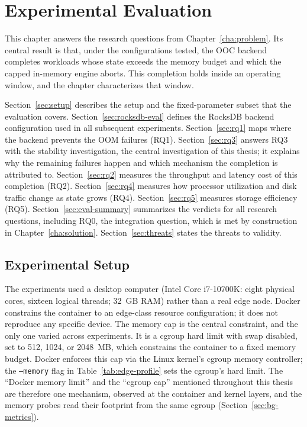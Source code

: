 \chapter{Experimental Evaluation\label{cha:evaluation}}

This chapter answers the research questions from Chapter~\ref{cha:problem}.
Its central result is that, under the configurations tested, the \ac{OOC} backend completes workloads whose state exceeds the memory budget and which the capped in-memory engine aborts.
This completion holds inside an operating window, and the chapter characterizes that window.

Section~\ref{sec:setup} describes the setup and the fixed-parameter subset that the evaluation covers.
Section~\ref{sec:rocksdb-eval} defines the RocksDB backend configuration used in all subsequent experiments.
Section~\ref{sec:rq1} maps where the backend prevents the OOM failures (RQ1).
Section~\ref{sec:rq3} answers RQ3 with the stability investigation, the central investigation of this thesis; it explains why the remaining failures happen and which mechanism the completion is attributed to.
Section~\ref{sec:rq2} measures the throughput and latency cost of this completion (RQ2).
Section~\ref{sec:rq4} measures how processor utilization and disk traffic change as state grows (RQ4).
Section~\ref{sec:rq5} measures storage efficiency (RQ5).
Section~\ref{sec:eval-summary} summarizes the verdicts for all research questions, including RQ0, the integration question, which is met by construction in Chapter~\ref{cha:solution}.
Section~\ref{sec:threats} states the threats to validity.

\section{Experimental Setup\label{sec:setup}}
\label{sec:reproducibility}

The experiments used a desktop computer (Intel Core i7-10700K: eight physical cores, sixteen logical threads; 32\, GB \ac{RAM}) rather than a real edge node.
Docker constrains the container to an edge-class resource configuration; it does not reproduce any specific device.
The memory cap is the central constraint, and the only one varied across experiments.
It is a cgroup hard limit with swap disabled, set to 512, 1024, or 2048\, MB, which constrains the container to a fixed memory budget.
Docker enforces this cap via the Linux kernel's \ac{cgroup} memory controller; the \texttt{--memory} flag in Table~\ref{tab:edge-profile} sets the cgroup's hard limit.
The ``Docker memory limit'' and the ``cgroup cap'' mentioned throughout this thesis are therefore one mechanism, observed at the container and kernel layers, and the memory probes read their footprint from the same cgroup (Section~\ref{sec:bg-metrics}).


